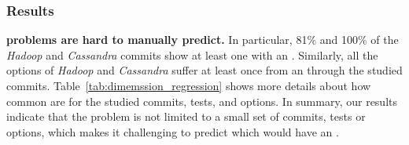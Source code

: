 

\subsubsection*{Results}

\noindent \textbf{\inconsistent problems are hard to manually predict.} In particular, 81\% and 100\% of the \emph{Hadoop} and \emph{Cassandra} %
commits show at least one \instance with an \inconsistent {}. Similarly, all the options of \emph{Hadoop} and \emph{Cassandra} suffer at least once from an \inconsistent through the studied commits. Table~\ref{tab:dimemssion_regression} shows more details about how common are \inconsistent for the studied commits, tests, and options. 
In summary, our results indicate that the \inconsistent problem is not limited to a small set of commits, tests or options, which makes it challenging to predict which \instance would have an \inconsistent.

